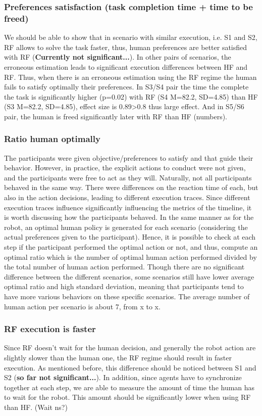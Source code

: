 \subsubsection*{Preferences satisfaction (task completion time + time to be freed)}
We should be able to show that in scenario with similar execution, i.e. S1 and S2, RF allows to solve the task faster, thus, human preferences are better satisfied with RF (\textbf{Currently not significant...}). 
In other pairs of scenarios, the erroneous estimation leads to significant execution differences between HF and RF. Thus, when there is an erroneous estimation using the RF regime the human fails to satisfy optimally their preferences. In S3/S4 pair the time the complete the task is significantly higher (p=0.02) with RF (S4 M=82.2, SD=4.85) than HF (S3 M=82.2, SD=4.85), effect size is 0.89>0.8 thus large effect. 
And in S5/S6 pair, the human is freed significantly later with RF than HF (numbers).

\subsubsection*{Ratio human optimally}
The participants were given objective/preferences to satisfy and that guide their behavior. However, in practice, the explicit actions to conduct were not given, and the participants were free to act as they will. Naturally, not all participants behaved in the same way. There were differences on the reaction time of each, but also in the action decisions, leading to different execution traces. Since different execution traces influence significantly influencing the metrics of the timeline, it is worth discussing how the participants behaved.
In the same manner as for the robot, an optimal human policy is generated for each scenario (considering the actual preferences given to the participant). Hence, it is possible to check at each step if the participant performed the optimal action or not, and thus, compute an optimal ratio which is the number of optimal human action performed divided by the total number of human action performed.  
Though there are no significant difference between the different scenarios, some scenarios still have lower average optimal ratio and high standard deviation, meaning that participants tend to have more various behaviors on these specific scenarios. 
The average number of human action per scenario is about 7, from x to x. 

\subsubsection*{RF execution is faster}
Since RF doesn't wait for the human decision, and generally the robot action are slightly slower than the human one, the RF regime should result in faster execution.
As mentioned before, this difference should be noticed between S1 and S2 (\textbf{so far not significant...}).
In addition, since agents have to synchronize together at each step, we are able to measure the amount of time the human has to wait for the robot. This amount should be significantly lower when using RF than HF. (Wait ns?)

